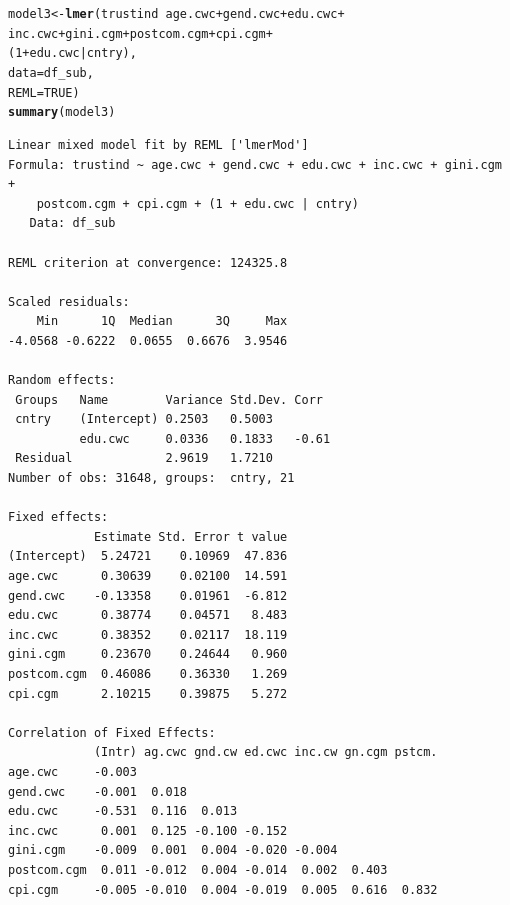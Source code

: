 \documentclass[12pt,english]{article}\usepackage[]{graphicx}\usepackage[usenames, dvipsnames]{xcolor}
\makeatletter
\newcommand{\hlnum}[1]{\textcolor[rgb]{0.686,0.059,0.569}{#1}}%
\newcommand{\hlopt}[1]{\textcolor[rgb]{0,0,0}{#1}}%
\newcommand{\hlstd}[1]{\textcolor[rgb]{0.345,0.345,0.345}{#1}}%
\newcommand{\hlkwb}[1]{\textcolor[rgb]{0.69,0.353,0.396}{#1}}%
\newcommand{\hlkwc}[1]{\textcolor[rgb]{0.333,0.667,0.333}{#1}}%
\newcommand{\hlkwd}[1]{\textcolor[rgb]{0.737,0.353,0.396}{\textbf{#1}}}%
\newenvironment{kframe}{%
 \def\at@end@of@kframe{}%
 \ifinner\ifhmode%
  \def\at@end@of@kframe{\end{minipage}}%
  \begin{minipage}{\columnwidth}%
 \fi\fi%
 \def\FrameCommand##1{\hskip\@totalleftmargin \hskip-\fboxsep
 \colorbox{shadecolor}{##1}\hskip-\fboxsep
     \hskip-\linewidth \hskip-\@totalleftmargin \hskip\columnwidth}%
 \MakeFramed {\advance\hsize-\width
   \@totalleftmargin\z@ \linewidth\hsize
   \@setminipage}}%
 {\par\unskip\endMakeFramed%
 \at@end@of@kframe}
\newenvironment{knitrout}{}{} %
\makeatother
\begin{document}
\begin{knitrout}
\color{fgcolor}\begin{kframe}
\begin{alltt}
\hlstd{model3} \hlkwb{<-} \hlkwd{lmer}\hlstd{(trustind} \hlopt{~} \hlstd{age.cwc} \hlopt{+} \hlstd{gend.cwc} \hlopt{+} \hlstd{edu.cwc} \hlopt{+}
                 \hlstd{inc.cwc} \hlopt{+} \hlstd{gini.cgm} \hlopt{+} \hlstd{postcom.cgm} \hlopt{+} \hlstd{cpi.cgm} \hlopt{+}
                 \hlstd{(}\hlnum{1} \hlopt{+} \hlstd{edu.cwc} \hlopt{|} \hlstd{cntry),}
               \hlkwc{data} \hlstd{= df_sub,}
               \hlkwc{REML} \hlstd{=} \hlnum{TRUE}\hlstd{)}
\hlkwd{summary}\hlstd{(model3)}
\end{alltt}
\begin{verbatim}
Linear mixed model fit by REML ['lmerMod']
Formula: trustind ~ age.cwc + gend.cwc + edu.cwc + inc.cwc + gini.cgm +  
    postcom.cgm + cpi.cgm + (1 + edu.cwc | cntry)
   Data: df_sub

REML criterion at convergence: 124325.8

Scaled residuals: 
    Min      1Q  Median      3Q     Max 
-4.0568 -0.6222  0.0655  0.6676  3.9546 

Random effects:
 Groups   Name        Variance Std.Dev. Corr 
 cntry    (Intercept) 0.2503   0.5003        
          edu.cwc     0.0336   0.1833   -0.61
 Residual             2.9619   1.7210        
Number of obs: 31648, groups:  cntry, 21

Fixed effects:
            Estimate Std. Error t value
(Intercept)  5.24721    0.10969  47.836
age.cwc      0.30639    0.02100  14.591
gend.cwc    -0.13358    0.01961  -6.812
edu.cwc      0.38774    0.04571   8.483
inc.cwc      0.38352    0.02117  18.119
gini.cgm     0.23670    0.24644   0.960
postcom.cgm  0.46086    0.36330   1.269
cpi.cgm      2.10215    0.39875   5.272

Correlation of Fixed Effects:
            (Intr) ag.cwc gnd.cw ed.cwc inc.cw gn.cgm pstcm.
age.cwc     -0.003                                          
gend.cwc    -0.001  0.018                                   
edu.cwc     -0.531  0.116  0.013                            
inc.cwc      0.001  0.125 -0.100 -0.152                     
gini.cgm    -0.009  0.001  0.004 -0.020 -0.004              
postcom.cgm  0.011 -0.012  0.004 -0.014  0.002  0.403       
cpi.cgm     -0.005 -0.010  0.004 -0.019  0.005  0.616  0.832
\end{verbatim}
\end{kframe}
\end{knitrout}
\end{document}

